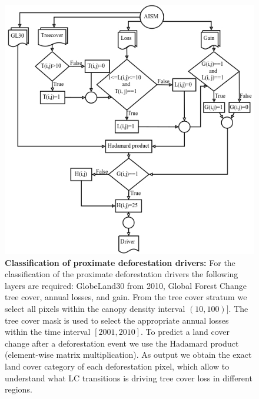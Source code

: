 			\begin{figure}[ht]
				\centering
				\includegraphics[scale=.88]{img/driver_flowchart}
				\caption[Classification of proximate deforestation drivers]{\textbf{Classification of proximate deforestation drivers:} For the classification of the proximate deforestation drivers the following layers are required: GlobeLand30 from 2010, Global Forest Change tree cover, annual losses, and gain. From the tree cover stratum we select all pixels within the canopy density interval $(10,100)]$. The tree cover mask is used to select the appropriate annual losses within the time interval $[2001,2010]$. To predict a land cover change after a deforestation event we use the Hadamard product (element-wise matrix multiplication). As output we obtain the exact land cover category of each deforestation pixel, which allow to understand what \ac{LC} transitions is driving tree cover loss in different regions.}
				\label{fig:driver_flowchart}
			\end{figure}

